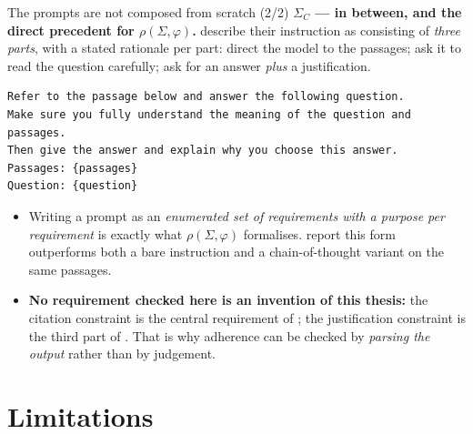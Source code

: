 \documentclass[11pt,aspectratio=169]{beamer}
\begin{document}
\begin{frame}[fragile]{The prompts are not composed from scratch (2/2)}
  \textbf{$\Sigma_C$ --- in between, and the direct precedent for
  $\rho(\Sigma,\varphi)$.} \citet{mao2024fitrag} describe their instruction as
  consisting of \emph{three parts}, with a stated rationale per part: direct
  the model to the passages; ask it to read the question carefully; ask for an
  answer \emph{plus} a justification.
\begin{lstlisting}[style=promptbox]
Refer to the passage below and answer the following question.
Make sure you fully understand the meaning of the question and passages.
Then give the answer and explain why you choose this answer.
Passages: {passages}
Question: {question}
\end{lstlisting}
  \medskip
  \begin{itemize}
    \item Writing a prompt as an \emph{enumerated set of requirements with a
          purpose per requirement} is exactly what $\rho(\Sigma,\varphi)$
          formalises. \citet{mao2024fitrag} report this form outperforms both
          a bare instruction and a chain-of-thought variant on the same
          passages.
    \item \textbf{No requirement checked here is an invention of this thesis:}
          the citation constraint is the central requirement of
          \citet{gao2023alce}; the justification constraint is the third part
          of \citet{mao2024fitrag}. That is why adherence can be checked by
          \emph{parsing the output} rather than by judgement.
  \end{itemize}
\end{frame}


\section{Limitations}
\end{document}
